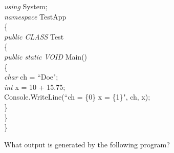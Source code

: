 {\begin{list}{E \thechapter.\theenumi}
\emph{using} System;\\
\emph{namespace} TestApp\\
\{\\
\hspace*{0.2in}    \emph{public CLASS} Test\\
\hspace*{0.2in}    \{\\
\hspace*{0.4in}        \emph{public static VOID} Main()\\
\hspace*{0.4in}        \{\\
\hspace*{0.6in}            \emph{char} ch = ``Doe";\\
\hspace*{0.6in}            \emph{int} x = 10 + 15.75;\\
\hspace*{0.6in}            Console.WriteLine(``ch = \{0\}  x = \{1\}", ch, x);\\
\hspace*{0.4in}        \}\\
\hspace*{0.2in}    \}\\
\}




\item What output is generated by the following program?


\end{list}}
